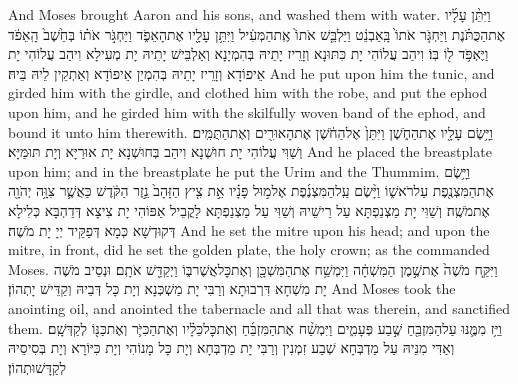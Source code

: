 {And Moses brought Aaron and his sons, and washed them with water.}{}
{וַיִּתֵּ֨ן עָלָ֜יו אֶת\maqqaf הַכֻּתֹּ֗נֶת וַיַּחְגֹּ֤ר אֹתוֹ֙ בָּֽאַבְנֵ֔ט וַיַּלְבֵּ֤שׁ אֹתוֹ֙ אֶֽת\maqqaf הַמְּעִ֔יל וַיִּתֵּ֥ן עָלָ֖יו אֶת\maqqaf הָאֵפֹ֑ד וַיַּחְגֹּ֣ר אֹת֗וֹ בְּחֵ֙שֶׁב֙ הָֽאֵפֹ֔ד וַיֶּאְפֹּ֥ד ל֖וֹ בּֽוֹ׃}
{וִיהַב עֲלוֹהִי יָת כִּתּוּנָא וְזָרֵיז יָתֵיהּ בְּהִמְיָנָא וְאַלְבֵּישׁ יָתֵיהּ יָת מְעִילָא וִיהַב עֲלוֹהִי יָת אֵיפוֹדָא וְזָרֵיז יָתֵיהּ בְּהִמְיַן אֵיפוֹדָא וְאַתְקֵין לֵיהּ בֵּיהּ׃}
{And he put upon him the tunic, and girded him with the girdle, and clothed him with the robe, and put the ephod upon him, and he girded him with the skilfully woven band of the ephod, and bound it unto him therewith.}{}
{וַיָּ֥שֶׂם עָלָ֖יו אֶת\maqqaf הַחֹ֑שֶׁן וַיִּתֵּן֙ אֶל\maqqaf הַחֹ֔שֶׁן אֶת\maqqaf הָאוּרִ֖ים וְאֶת\maqqaf הַתֻּמִּֽים׃}
{וְשַׁוִּי עֲלוֹהִי יָת חוּשְׁנָא וִיהַב בְּחוּשְׁנָא יָת אוּרַיָּא וְיָת תּוּמַּיָּא׃}
{And he placed the breastplate upon him; and in the breastplate he put the Urim and the Thummim.}{}
{וַיָּ֥שֶׂם אֶת\maqqaf הַמִּצְנֶ֖פֶת עַל\maqqaf רֹאשׁ֑וֹ וַיָּ֨שֶׂם עַֽל\maqqaf הַמִּצְנֶ֜פֶת אֶל\maqqaf מ֣וּל פָּנָ֗יו אֵ֣ת צִ֤יץ הַזָּהָב֙ נֵ֣זֶר הַקֹּ֔דֶשׁ כַּאֲשֶׁ֛ר צִוָּ֥ה יְהֹוָ֖ה אֶת\maqqaf מֹשֶֽׁה׃}
{וְשַׁוִּי יָת מַצְנַפְתָּא עַל רֵישֵׁיהּ וְשַׁוִּי עַל מַצְנַפְתָּא לָקֳבֵיל אַפּוֹהִי יָת צִיצָא דְּדַהְבָּא כְּלִילָא דְּקוּדְשָׁא כְּמָא דְּפַקֵּיד יְיָ יָת מֹשֶׁה׃}
{And he set the mitre upon his head; and upon the mitre, in front, did he set the golden plate, the holy crown; as the \lord\space commanded Moses.}{}
{וַיִּקַּ֤ח מֹשֶׁה֙ אֶת\maqqaf שֶׁ֣מֶן הַמִּשְׁחָ֔ה וַיִּמְשַׁ֥ח אֶת\maqqaf הַמִּשְׁכָּ֖ן וְאֶת\maqqaf כׇּל\maqqaf אֲשֶׁר\maqqaf בּ֑וֹ וַיְקַדֵּ֖שׁ אֹתָֽם׃}
{וּנְסֵיב מֹשֶׁה יָת מִשְׁחָא דִּרְבוּתָא וְרַבִּי יָת מַשְׁכְּנָא וְיָת כָּל דְּבֵיהּ וְקַדֵּישׁ יָתְהוֹן׃}
{And Moses took the anointing oil, and anointed the tabernacle and all that was therein, and sanctified them.}{}
{וַיַּ֥ז מִמֶּ֛נּוּ עַל\maqqaf הַמִּזְבֵּ֖חַ שֶׁ֣בַע פְּעָמִ֑ים וַיִּמְשַׁ֨ח אֶת\maqqaf הַמִּזְבֵּ֜חַ וְאֶת\maqqaf כׇּל\maqqaf כֵּלָ֗יו וְאֶת\maqqaf הַכִּיֹּ֛ר וְאֶת\maqqaf כַּנּ֖וֹ לְקַדְּשָֽׁם׃}
{וְאַדִּי מִנֵּיהּ עַל מַדְבְּחָא שְׁבַע זִמְנִין וְרַבִּי יָת מַדְבְּחָא וְיָת כָּל מָנוֹהִי וְיָת כִּיּוֹרָא וְיָת בְּסִיסֵיהּ לְקַדָּשׁוּתְהוֹן׃}
